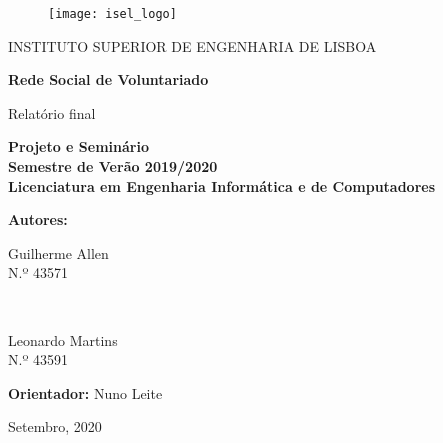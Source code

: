 {\centering
	
	\begin{figure}[t!]
		\texttt{[image: isel\_logo]}	
		\centering
	\end{figure}
	
	
	\centerline{\LARGE{INSTITUTO SUPERIOR DE ENGENHARIA DE LISBOA}}
	\bigskip
	\bigskip
	
	{ \huge \bfseries Rede Social de Voluntariado \medskip}
	
	{\large Relatório final}
	
	\bigskip
	
	\textbf{
		Projeto e Seminário\\
		Semestre de Verão 2019/2020\\
		Licenciatura em Engenharia Informática e de Computadores
	}
	\bigskip
	\bigskip
	
	\large \textbf{Autores:}
	\bigskip
	
	\begin{minipage}{0.4\textwidth}
		\begin{flushleft} 
			Guilherme Allen\\
			N.º 43571\\
		\end{flushleft}
	\end{minipage}
	~	
	\begin{minipage}{0.4\textwidth}
		\begin{flushright} 
			Leonardo Martins\\ 
			N.º 43591\\
		\end{flushright}
	\end{minipage}
	\bigskip
	\bigskip
	
	\large \textbf{Orientador:} Nuno Leite
	
	\vspace*{\fill}
	\begin{center}
		Setembro, 2020
	\end{center}
}